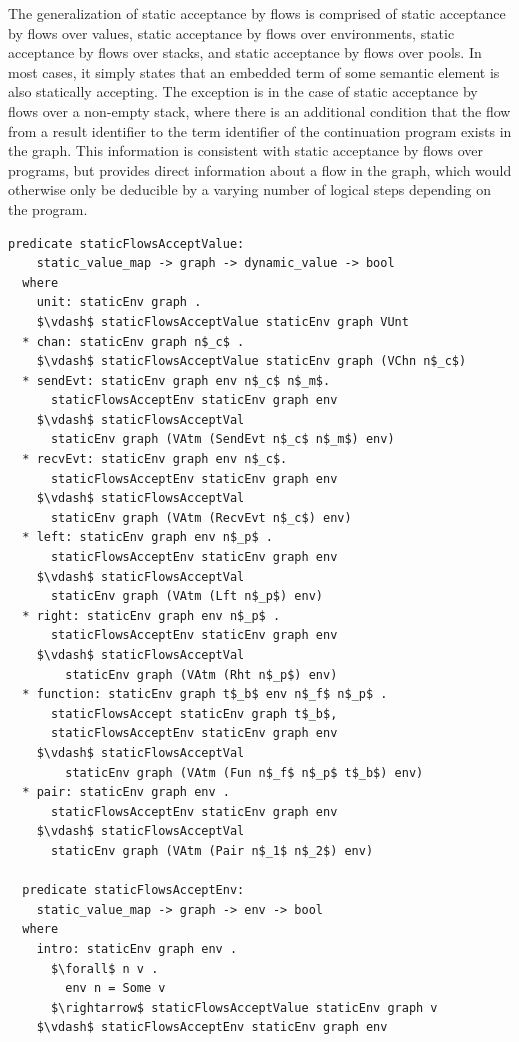 \documentclass[letterpaper, 11pt]{extarticle}
\begin{document}
The generalization of static acceptance by flows is comprised of static acceptance by flows over values,
static acceptance by flows over environments, static acceptance by flows over stacks, and static
acceptance by flows over pools.
In most cases, it simply states that an embedded term of some semantic element is also statically
accepting. The exception is in the case of
static acceptance by flows over a non-empty stack, where
there is an additional condition that the flow
from a result identifier to the term identifier
of the continuation program exists in the graph.
This information is consistent with static
acceptance by flows over programs, but provides direct information about a flow in the
graph, which would otherwise only be deducible by a varying number of logical steps
depending on the program.

\begin{lstlisting}[language=logic, mathescape]
  predicate staticFlowsAcceptValue:
    static_value_map -> graph -> dynamic_value -> bool
  where
    unit: staticEnv graph .
    $\vdash$ staticFlowsAcceptValue staticEnv graph VUnt
  * chan: staticEnv graph n$_c$ .
    $\vdash$ staticFlowsAcceptValue staticEnv graph (VChn n$_c$)
  * sendEvt: staticEnv graph env n$_c$ n$_m$.
      staticFlowsAcceptEnv staticEnv graph env 
    $\vdash$ staticFlowsAcceptVal
      staticEnv graph (VAtm (SendEvt n$_c$ n$_m$) env)
  * recvEvt: staticEnv graph env n$_c$.
      staticFlowsAcceptEnv staticEnv graph env 
    $\vdash$ staticFlowsAcceptVal
      staticEnv graph (VAtm (RecvEvt n$_c$) env)
  * left: staticEnv graph env n$_p$ .
      staticFlowsAcceptEnv staticEnv graph env 
    $\vdash$ staticFlowsAcceptVal
      staticEnv graph (VAtm (Lft n$_p$) env)
  * right: staticEnv graph env n$_p$ .
      staticFlowsAcceptEnv staticEnv graph env
    $\vdash$ staticFlowsAcceptVal
        staticEnv graph (VAtm (Rht n$_p$) env)
  * function: staticEnv graph t$_b$ env n$_f$ n$_p$ .
      staticFlowsAccept staticEnv graph t$_b$, 
      staticFlowsAcceptEnv staticEnv graph env
    $\vdash$ staticFlowsAcceptVal
        staticEnv graph (VAtm (Fun n$_f$ n$_p$ t$_b$) env)
  * pair: staticEnv graph env . 
      staticFlowsAcceptEnv staticEnv graph env
    $\vdash$ staticFlowsAcceptVal
      staticEnv graph (VAtm (Pair n$_1$ n$_2$) env)

  predicate staticFlowsAcceptEnv:
    static_value_map -> graph -> env -> bool
  where 
    intro: staticEnv graph env .
      $\forall$ n v . 
        env n = Some v
      $\rightarrow$ staticFlowsAcceptValue staticEnv graph v
    $\vdash$ staticFlowsAcceptEnv staticEnv graph env


\end{lstlisting}
\end{document}
